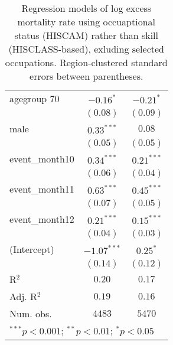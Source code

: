 \begin{table}
\begin{center}
\begin{tabular}{l c c}
agegroup 70     & $-0.16^{*}$   & $-0.21^{*}$   \\
                & $(0.08)$      & $(0.09)$      \\
male            & $0.33^{***}$  & $0.08$        \\
                & $(0.05)$      & $(0.05)$      \\
event\_month10  & $0.34^{***}$  & $0.21^{***}$  \\
                & $(0.06)$      & $(0.04)$      \\
event\_month11  & $0.63^{***}$  & $0.45^{***}$  \\
                & $(0.07)$      & $(0.05)$      \\
event\_month12  & $0.21^{***}$  & $0.15^{***}$  \\
                & $(0.04)$      & $(0.03)$      \\
(Intercept)     & $-1.07^{***}$ & $0.25^{*}$    \\
                & $(0.14)$      & $(0.12)$      \\
\hline
R$^2$           & $0.20$        & $0.17$        \\
Adj. R$^2$      & $0.19$        & $0.16$        \\
Num. obs.       & $4483$        & $5470$        \\
\hline
\multicolumn{3}{l}{\scriptsize{$^{***}p<0.001$; $^{**}p<0.01$; $^{*}p<0.05$}}
\end{tabular}
\caption{Regression models of log excess mortality rate using occuaptional status (HISCAM) rather than skill (HISCLASS-based), exluding selected occupations. Region-clustered standard errors between parentheses.}
\label{tab:hiscammodels}
\end{center}
\end{table}
